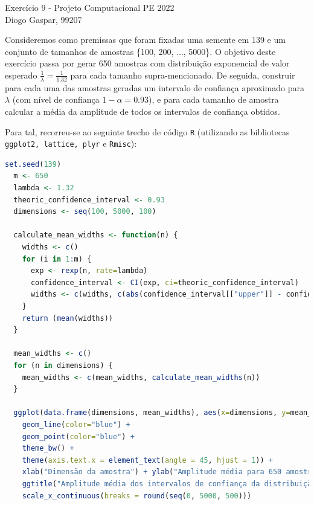 \documentclass[11pt]{article}
\newcommand{\gaspar}{Diogo Gaspar, 99207}
\begin{document}
\begin{center}
{\huge{Exercício 9 - Projeto Computacional PE 2022}} \\
\vspace{1.5mm}
{\large{\gaspar}} \\
\end{center}

Consideremos como premissas que foram fixadas uma semente em 139 e um conjunto de
tamanhos de amostras \{100, 200, ..., 5000\}.
O objetivo deste exercício passa por gerar 650 amostras com distribuição exponencial
de valor esperado $\frac{1}{\lambda} = \frac{1}{1.32}$ para cada tamanho supra-mencionado.
De seguida, construir para cada uma das amostras geradas um intervalo de confiança
aproximado para $\lambda$ (com nível de confiança $1 - \alpha = 0.93$), e para cada
tamanho de amostra calcular a média da amplitude de todos os intervalos de confiança
obtidos.

\vspace{0.5mm}
Para tal, recorreu-se ao seguinte trecho de código \texttt{R} (utilizando as bibliotecas \texttt{ggplot2, lattice, plyr} e \texttt{Rmisc}):

\begin{lstlisting}[language=R]
  set.seed(139)
  m <- 650
  lambda <- 1.32
  theoric_confidence_interval <- 0.93
  dimensions <- seq(100, 5000, 100)
  
  calculate_mean_widths <- function(n) {
    widths <- c()
    for (i in 1:m) {
      exp <- rexp(n, rate=lambda)
      confidence_interval <- CI(exp, ci=theoric_confidence_interval)
      widths <- c(widths, c(abs(confidence_interval[["upper"]] - confidence_interval[["lower"]])))
    }
    return (mean(widths))
  }
  
  mean_widths <- c()
  for (n in dimensions) {
    mean_widths <- c(mean_widths, calculate_mean_widths(n))
  }

  ggplot(data.frame(dimensions, mean_widths), aes(x=dimensions, y=mean_widths)) +
    geom_line(color="blue") +
    geom_point(color="blue") +
    theme_bw() +
    theme(axis.text.x = element_text(angle = 45, hjust = 1)) +
    xlab("Dimensão da amostra") + ylab("Amplitude média para 650 amostras") +
    ggtitle("Amplitude média dos intervalos de confiança da distribuição exponencial") +
    scale_x_continuous(breaks = round(seq(0, 5000, 500)))
\end{lstlisting}
\end{document}
